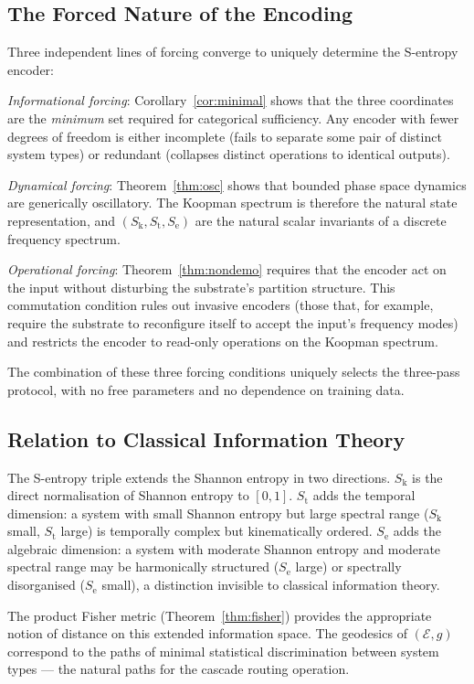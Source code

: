 \documentclass[11pt,twocolumn,a4paper]{article}
\theoremstyle{definition}
\theoremstyle{remark}
\newcommand{\Sk}{S_{\mathrm{k}}}
\newcommand{\St}{S_{\mathrm{t}}}
\newcommand{\Se}{S_{\mathrm{e}}}
\begin{document}
\subsection{The Forced Nature of the Encoding}

Three independent lines of forcing converge to uniquely determine the S-entropy
encoder:

\textit{Informational forcing}: Corollary~\ref{cor:minimal} shows that the
three coordinates are the \emph{minimum} set required for categorical sufficiency.
Any encoder with fewer degrees of freedom is either incomplete (fails to separate
some pair of distinct system types) or redundant (collapses distinct operations
to identical outputs).

\textit{Dynamical forcing}: Theorem~\ref{thm:osc} shows that bounded phase space
dynamics are generically oscillatory. The Koopman spectrum is therefore the
natural state representation, and $(\Sk, \St, \Se)$ are the natural scalar
invariants of a discrete frequency spectrum.

\textit{Operational forcing}: Theorem~\ref{thm:nondemo} requires that the encoder
act on the input without disturbing the substrate's partition structure.
This commutation condition rules out invasive encoders (those that, for example,
require the substrate to reconfigure itself to accept the input's frequency modes)
and restricts the encoder to read-only operations on the Koopman spectrum.

The combination of these three forcing conditions uniquely selects the three-pass
protocol, with no free parameters and no dependence on training data.

\subsection{Relation to Classical Information Theory}

The S-entropy triple extends the Shannon entropy \citep{shannon1948} in two
directions. $\Sk$ is the direct normalisation of Shannon entropy to $[0,1]$.
$\St$ adds the temporal dimension: a system with small Shannon entropy but large
spectral range ($\Sk$ small, $\St$ large) is temporally complex but kinematically
ordered. $\Se$ adds the algebraic dimension: a system with moderate Shannon
entropy and moderate spectral range may be harmonically structured ($\Se$ large)
or spectrally disorganised ($\Se$ small), a distinction invisible to classical
information theory.

The product Fisher metric (Theorem~\ref{thm:fisher}) provides the appropriate
notion of distance on this extended information space. The geodesics of
$(\mathcal{E}, g)$ correspond to the paths of minimal statistical discrimination
between system types --- the natural paths for the cascade routing operation.
\end{document}
